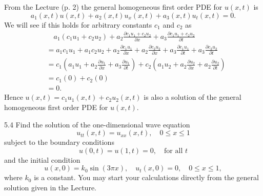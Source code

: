 \begin{derivation}
  From the Lecture (p. 2) the general homogeneous first order PDE for $u(x,t)$ is
  \begin{equation*}
    a_1(x,t) u(x,t) + a_2(x,t) u_x(x,t) + a_3(x,t) u_t(x,t) = 0
  .\end{equation*}
  We will see if this holds for arbitrary constants $c_1$ and $c_2$ as
  \begin{align*}
    & \quad a_1 (c_1 u_1 + c_2 u_2) + a_2 \frac{\partial c_1 u_1 + c_2 u_2}{\partial x} + a_3 \frac{\partial c_1 u_1 + c_2 u_2}{\partial t} \\
    &= a_1 c_1 u_1 + a_1 c_2 u_2 + a_2 \frac{\partial c_1 u_1}{\partial x} + a_2 \frac{\partial c_2 u_2}{\partial x} + a_3 \frac{\partial c_1 u_1}{\partial t} + a_3 \frac{\partial c_2 u_2}{\partial t}  \\
    &= c_1 \left( a_1 u_1 + a_2 \frac{\partial u_1}{\partial x} + a_3 \frac{\partial u_1}{\partial t}  \right) + c_2 \left( a_1 u_2 + a_2 \frac{\partial u_2}{\partial x} + a_2 \frac{\partial u_2}{\partial t}  \right) \\
    &= c_1 \left( 0 \right) + c_2 \left( 0 \right) \\
    &= 0
  .\end{align*}
  Hence $u(x,t) = c_1 u_1(x,t) + c_2 u_2(x,t)$ is also a solution of the general homogeneous first order PDE for $u(x,t)$.
\end{derivation}

\newpage

\begin{problem}{5.4}
  Find the solution of the one-dimensional wave equation
\[ 
u_{tt} (x,t) = u_{x x} (x,t), \quad 0 \leq x \leq 1
\]
subject to the boundary conditions
\[ 
u(0,t) = u(1,t) = 0, \quad \text{for all } t
\]
and the initial condition
\[ 
u(x,0) = k_0 \sin \left( 3 \pi x \right), \quad u_t(x,0) = 0, \quad 0 \leq x\leq 1,
\]
where $k_0$ is a constant.
You may start your calculations directly from the general solution given in the Lecture.
\end{problem}

